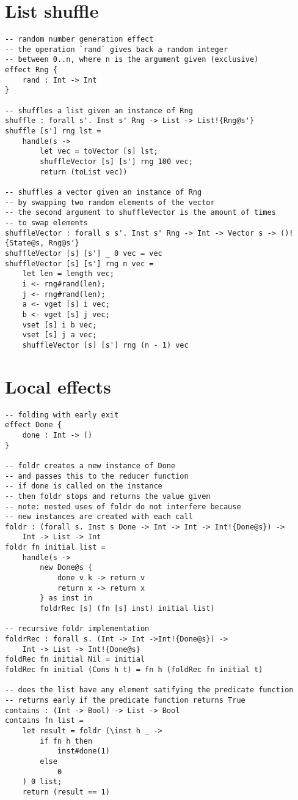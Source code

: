 \section{List shuffle}
\begin{verbatim}
-- random number generation effect
-- the operation `rand` gives back a random integer
-- between 0..n, where n is the argument given (exclusive)
effect Rng {
	rand : Int -> Int
}

-- shuffles a list given an instance of Rng
shuffle : forall s'. Inst s' Rng -> List -> List!{Rng@s'}
shuffle [s'] rng lst =
	handle(s ->
		let vec = toVector [s] lst;
		shuffleVector [s] [s'] rng 100 vec;
		return (toList vec))

-- shuffles a vector given an instance of Rng
-- by swapping two random elements of the vector
-- the second argument to shuffleVector is the amount of times
-- to swap elements
shuffleVector : forall s s'. Inst s' Rng -> Int -> Vector s -> ()!{State@s, Rng@s'}
shuffleVector [s] [s'] _ 0 vec = vec
shuffleVector [s] [s'] rng n vec =
	let len = length vec;
	i <- rng#rand(len);
	j <- rng#rand(len);
	a <- vget [s] i vec;
	b <- vget [s] j vec;
	vset [s] i b vec;
	vset [s] j a vec;
	shuffleVector [s] [s'] rng (n - 1) vec
\end{verbatim}

\section{Local effects}
\begin{verbatim}
-- folding with early exit
effect Done {
	done : Int -> ()
}

-- foldr creates a new instance of Done
-- and passes this to the reducer function
-- if done is called on the instance
-- then foldr stops and returns the value given
-- note: nested uses of foldr do not interfere because
-- new instances are created with each call
foldr : (forall s. Inst s Done -> Int -> Int -> Int!{Done@s}) ->
	Int -> List -> Int
foldr fn initial list =
	handle(s ->
		new Done@s {
			done v k -> return v
			return x -> return x
		} as inst in
		foldrRec [s] (fn [s] inst) initial list)

-- recursive foldr implementation
foldrRec : forall s. (Int -> Int ->Int!{Done@s}) ->
	Int -> List -> Int!{Done@s}
foldRec fn initial Nil = initial
foldRec fn initial (Cons h t) = fn h (foldRec fn initial t)

-- does the list have any element satifying the predicate function
-- returns early if the predicate function returns True
contains : (Int -> Bool) -> List -> Bool
contains fn list =
	let result = foldr (\inst h _ ->
		if fn h then
			inst#done(1)
		else
			0
	) 0 list;
	return (result == 1)
\end{verbatim}

